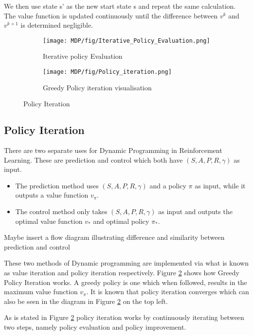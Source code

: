 We then use state s' as the new start state s and repeat the same calculation.
The value function is updated continuously until the difference between $v^{k}$ and $v^{k+1}$ is determined negligible.

\begin{figure}
	\centering
	\begin{subfigure}{.49\textwidth}
		\centering
		\texttt{[image: MDP/fig/Iterative\_Policy\_Evaluation.png]}
		\caption{Iterative policy Evaluation\cite{David_Silver}}
		\label{fig:iterative_policy_evaluation}
	\end{subfigure}
	\begin{subfigure}{.49\textwidth}
		\centering
		\texttt{[image: MDP/fig/Policy\_iteration.png]}
		\caption{Greedy Policy iteration visualisation\cite{David_Silver}}
		\label{fig:greedy_policy_iteration}
	\end{subfigure}
	\caption{Policy Iteration \cite{David_Silver}}
	\label{fig:policy_iteration}
\end{figure}

\subsection{Policy Iteration}
There are two separate uses for Dynamic Programming in Reinforcement Learning. These are prediction and control which both have $(S,A,P,R,\gamma)$ as input.
\begin{itemize}
	\item The prediction method uses $(S,A,P,R,\gamma)$ and a policy $\pi$ as input, while it outputs a value function $v_\pi$.
	\item The control method only takes $(S,A,P,R,\gamma)$ as input and outputs the optimal value function $v_*$ and optimal policy $\pi_{*}$.
\end{itemize}
{\color{red} Maybe insert a flow diagram illustrating difference and similarity between prediction and control }

These two methods of Dynamic programming are implemented via what is known as value iteration and policy iteration respectively.
Figure \ref{fig:greedy_policy_iteration} shows how Greedy Policy Iteration works. A greedy policy is one which when followed, results in the maximum value function $v_\pi$. It is known that policy iteration converges which can also be seen in the diagram in Figure \ref{fig:greedy_policy_iteration} on the top left.\cite{sutton_barto}

As is stated in Figure \ref{fig:greedy_policy_iteration} policy iteration works by continuously iterating between two steps, namely policy evaluation and policy improvement.


